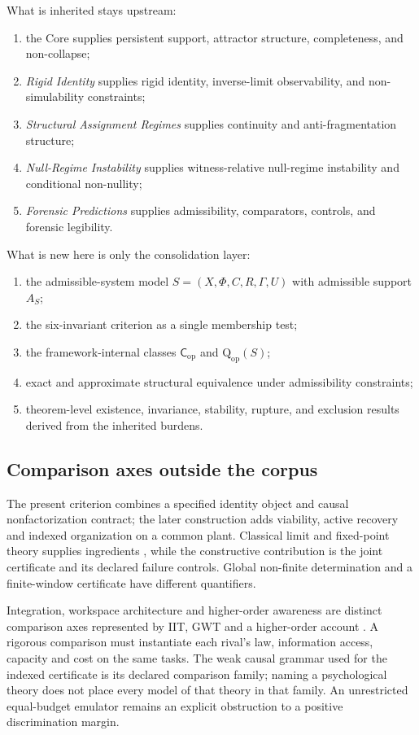 \documentclass[11pt,a4paper]{article}
\theoremstyle{definition}
\newcommand{\Cop}{\mathsf{C}_{\mathrm{op}}}
\newcommand{\Qop}{\mathrm{Q}_{\mathrm{op}}}
\newcommand{\Aset}{A_S}
\begin{document}
What is inherited stays upstream:
\begin{enumerate}[leftmargin=1.5em]
\item the Core supplies persistent support, attractor structure, completeness, and non-collapse;
\item \textit{Rigid Identity} supplies rigid identity, inverse-limit observability, and non-simulability constraints;
\item \textit{Structural Assignment Regimes} supplies continuity and anti-fragmentation structure;
\item \textit{Null-Regime Instability} supplies witness-relative null-regime instability and conditional non-nullity;
\item \textit{Forensic Predictions} supplies admissibility, comparators, controls, and forensic legibility.
\end{enumerate}

What is new here is only the consolidation layer:
\begin{enumerate}[leftmargin=1.5em]
\item the admissible-system model $S=(X,\Phi,C,R,\Gamma,U)$ with admissible support $\Aset$;
\item the six-invariant criterion as a single membership test;
\item the framework-internal classes $\Cop$ and $\Qop(S)$;
\item exact and approximate structural equivalence under admissibility constraints;
\item theorem-level existence, invariance, stability, rupture, and exclusion results derived from the inherited burdens.
\end{enumerate}

\subsection{Comparison axes outside the corpus}
The present criterion combines a specified identity object and causal
nonfactorization contract; the later construction adds viability, active
recovery and indexed organization on a common plant. Classical limit and
fixed-point theory supplies ingredients \cite{maclane1998,banach}, while
the constructive contribution is the joint certificate and its declared
failure controls. Global non-finite determination and a finite-window
certificate have different quantifiers.

Integration, workspace architecture and higher-order awareness are distinct
comparison axes represented by IIT, GWT and a higher-order account
\cite{tononi2004,baars1988,rosenthal1986}. A rigorous comparison must instantiate
each rival's law, information access, capacity and cost on the same tasks.
The weak causal grammar used for the indexed certificate is its declared
comparison family; naming a psychological theory does not place every model
of that theory in that family. An unrestricted equal-budget emulator remains
an explicit obstruction to a positive discrimination margin.
\end{document}
